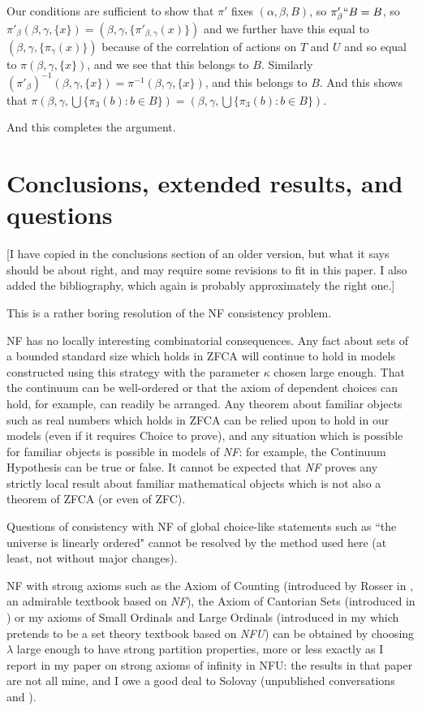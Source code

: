 \documentclass[12pt]{article}
\begin{document}
Our conditions are sufficient to show that $\pi'$ fixes $(\alpha,\beta,B)$, so $\pi'_\beta``B = B$, so $\pi'_\beta(\beta,\gamma,\{x\}) = (\beta,\gamma,\{\pi'_{\beta,\gamma}(x)\})$ and we further have this equal to  $(\beta,\gamma,\{\pi_{\gamma}(x)\})$ because of the correlation of actions on $T$ and $U$ and so equal to $\pi(\beta,\gamma,\{x\})$, and we see that this belongs to $B$.  Similarly 
$(\pi'_{\beta})^{-1}(\beta,\gamma,\{x\}) = \pi^{-1}(\beta,\gamma,\{x\})$, and this belongs to $B$.  And this shows that $\pi(\beta,\gamma,\bigcup\{\pi_3(b):b \in B\})=(\beta,\gamma,\bigcup\{\pi_3(b):b \in B\})$.


And this completes the argument.  



\section{Conclusions, extended results, and questions}

[I have copied in the conclusions section of an older version, but what it says should be about right, 
and may require some revisions to fit in this paper.  I also added the bibliography, which again is probably approximately the right one.]

This is a rather boring resolution of the NF consistency problem.

NF has no locally interesting combinatorial consequences.   Any fact about sets of a bounded standard size which holds in ZFCA will continue to hold in models constructed using this strategy with the parameter $\kappa$ chosen large enough.
That the continuum can be well-ordered or that the axiom of dependent choices can hold, for example, can readily be arranged.  Any theorem about familiar objects such as real numbers which holds in ZFCA can be relied upon to hold in our models
(even if it requires Choice to prove), and any situation which is possible for familiar objects is possible in models of {\em NF\/}:  for example, the Continuum Hypothesis can be true or false.  It cannot be expected that {\em NF\/} proves any strictly local result about familiar mathematical objects which is not also a theorem of ZFCA (or even of ZFC).

Questions of consistency with NF of global choice-like statements such as ``the universe is linearly ordered"  cannot be resolved by the method used here (at least, not without major changes).

NF with strong axioms such as the Axiom of Counting (introduced by Rosser in \cite{rosser}, an admirable textbook based on {\em NF\/}), the Axiom of Cantorian Sets (introduced in \cite{henson})  or my axioms of Small Ordinals and Large Ordinals (introduced in  my \cite{mybook} which pretends to be a set theory textbook based on {\em NFU\/}) can be obtained by choosing $\lambda$ large enough to have strong partition properties, more or less exactly as I report in my paper \cite{strongaxioms} on strong axioms of infinity in NFU:  the results in that paper are not all mine, and I owe a good deal to Solovay (unpublished conversations and \cite{nfub}).
\end{document}
